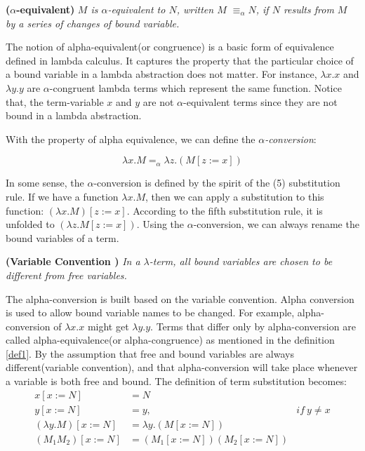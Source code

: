 \begin{def1}\label{def1}
\normalfont \textbf{($\alpha$-equivalent)} \textit{$M$ is $\alpha$-equivalent to $N$, written $M$ $\equiv_\alpha N$, if $N$ results from $M$ by a series of changes of bound variable.}
\end{def1}

The notion of alpha-equivalent(or congruence) is a basic form of equivalence defined in lambda calculus. It captures the property that the particular choice of a bound variable in a lambda abstraction does not matter. For instance, $\lambda x.x$ and $\lambda y.y$ are $\alpha$-congruent lambda terms which represent the same function. Notice that, the term-variable $x$ and $y$ are not $\alpha$-equivalent terms since they are not bound in a lambda abstraction.

With the property of alpha equivalence, we can define the \textit{$\alpha$-conversion}:

\begin{equation*}
\lambda x.M =_\alpha \lambda z.(M[z:=x])
\end{equation*}

In some sense, the $\alpha$-conversion is defined by the spirit of the (5) substitution rule. If we have a function $\lambda x.M$, then we can apply a substitution to this function: $(\lambda x.M)[z:=x]$. According to the fifth substitution rule, it is unfolded to $(\lambda z.M[z:=x])$. Using the $\alpha$-conversion, we can always rename the bound variables of a term. 

\begin{def1}
\normalfont \textbf{(Variable Convention \cite{hankin1994lambda})} \textit{In a $\lambda$-term, all bound variables are chosen to be different from free variables.}
\end{def1}

The alpha-conversion is built based on the variable convention. Alpha conversion is used to allow bound variable names to be changed. For example, alpha-conversion of $\lambda x.x$ might get $\lambda y.y$. Terms that differ only by alpha-conversion are called alpha-equivalence(or alpha-congruence) as mentioned in the definition \ref{def1}. By the assumption that free and bound variables are always different(variable convention), and that alpha-conversion will take place whenever a variable is both free and bound. The definition of term substitution becomes:
\begin{equation*}
\begin{array}{rll}
x[x:=N]&=N & ~\\
y[x:=N]&=y,& if\ y\neq x\\
(\lambda y.M)[x:=N]&=\lambda y.(M[x:=N])& \\
(M_1M_2)[x:=N] &= (M_1[x:=N])(M_2[x:=N])&
\end{array} 
\end{equation*}

